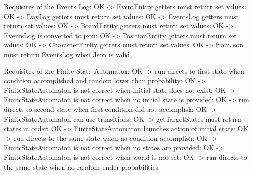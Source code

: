 \documentclass[a4paper]{article}
\begin{document}
Requisites of the Events Log: OK -{\textgreater} EventEntity getters must return set values: OK -{\textgreater} DayLog getters must return set values: OK -{\textgreater} EventsLog getters must return set values: OK -{\textgreater} BoardEntity getters must return set values: OK -{\textgreater} EventsLog is converted to json: OK -{\textgreater} PositionEntity getters must return set
values: OK -{\textgreater} CharacterEntity getters must return set
values: OK -{\textgreater} fromJson must return EventsLog when Json is valid

Requisites of the Finite State Automaton: OK -{\textgreater} run directs to first state when condition
accomplished and random lower than probability: OK -{\textgreater} FiniteStateAutomaton is not correct when initial
state does not exist: OK -{\textgreater} FiniteStateAutomaton is not correct when no
initial state is provided: OK -{\textgreater} run directs to second state when first condition
did not accomplish: OK -{\textgreater} FiniteStateAutomaton can use transitions: OK -{\textgreater} getTargetStates must return states in
order: OK -{\textgreater} FiniteStateAutomaton launches action of initial
state: OK -{\textgreater} run directs to the same state when no condition
accomplish: OK -{\textgreater} FiniteStateAutomaton is not correct when no states
are provided: OK -{\textgreater} FiniteStateAutomaton is not correct when world is
not set: OK -{\textgreater} run directs to the same state when no random
under probabilities
\end{document}
